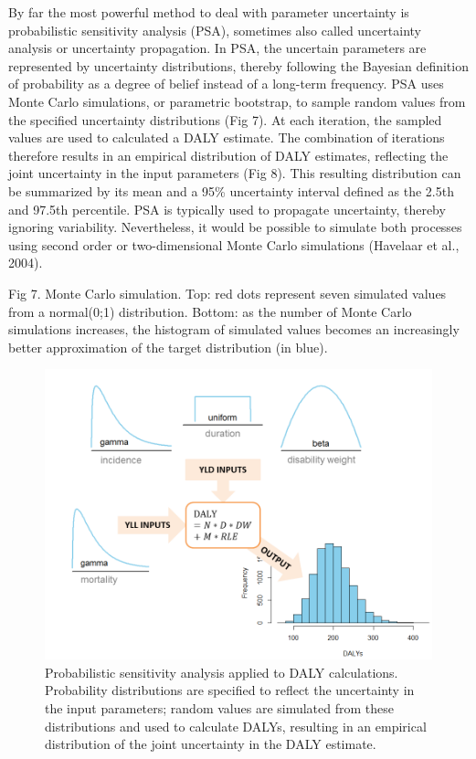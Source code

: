 \documentclass[]{book}
\begin{document}
By far the most powerful method to deal with parameter uncertainty is
probabilistic sensitivity analysis (PSA), sometimes also called
uncertainty analysis or uncertainty propagation. In PSA, the uncertain
parameters are represented by uncertainty distributions, thereby
following the Bayesian definition of probability as a degree of belief
instead of a long-term frequency. PSA uses Monte Carlo simulations, or
parametric bootstrap, to sample random values from the specified
uncertainty distributions (Fig 7). At each iteration, the sampled values
are used to calculated a DALY estimate. The combination of iterations
therefore results in an empirical distribution of DALY estimates,
reflecting the joint uncertainty in the input parameters (Fig 8). This
resulting distribution can be summarized by its mean and a 95\%
uncertainty interval defined as the 2.5th and 97.5th percentile. PSA is
typically used to propagate uncertainty, thereby ignoring variability.
Nevertheless, it would be possible to simulate both processes using
second order or two-dimensional Monte Carlo simulations (Havelaar et
al., 2004).

Fig 7. Monte Carlo simulation. Top: red dots represent seven simulated
values from a normal(0;1) distribution. Bottom: as the number of Monte
Carlo simulations increases, the histogram of simulated values becomes
an increasingly better approximation of the target distribution (in
blue).

\begin{figure}
\centering
\includegraphics{img/uncertainty.png}
\caption{Probabilistic sensitivity analysis applied to DALY
calculations. Probability distributions are specified to reflect the
uncertainty in the input parameters; random values are simulated from
these distributions and used to calculate DALYs, resulting in an
empirical distribution of the joint uncertainty in the DALY estimate.}
\end{figure}
\end{document}
